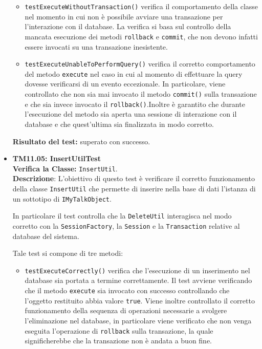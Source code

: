 \begin{itemize}
\begin{itemize}
\item \texttt{testExecuteWithoutTransaction()}
verifica il comportamento della classe nel momento in cui non è possibile avviare una transazione per l'interazione con il database.
La verifica si basa sul controllo della mancata esecuzione dei metodi \texttt{rollback} e \texttt{commit}, che non devono infatti essere invocati su una transazione inesistente.

\item \texttt{testExecuteUnableToPerformQuery()} verifica il corretto comportamento del metodo \texttt{execute} nel caso in cui al momento di effettuare la query dovesse verificarsi di un evento eccezionale. In particolare, viene controllato che non sia mai invocato il metodo \texttt{commit()} sulla transazione e che sia invece invocato il \texttt{rollback()}.Inoltre è garantito che durante l'esecuzione del metodo sia aperta una sessione di interazione con il database e che quest'ultima sia finalizzata in modo corretto. 
\end{itemize}
\textbf{Risultato del test:} superato con successo.

\item[\passed] \textbf{TM11.05: InsertUtilTest}\\
\textbf{Verifica la Classe:} \texttt{InsertUtil}.\\
\textbf{Descrizione}: L'obiettivo di questo test è verificare il corretto funzionamento della classe \texttt{InsertUtil} che permette di inserire nella base di dati l'istanza di un sottotipo di \texttt{IMyTalkObject}.

In particolare il test controlla che la \texttt{DeleteUtil} interagisca nel modo corretto con la \texttt{SessionFactory}, la \texttt{Session} e la \texttt{Transaction} relative al database del sistema.

Tale test si compone di tre metodi:
\begin{itemize}
\item \texttt{testExecuteCorrectly()} 
verifica che l'esecuzione di un inserimento nel database sia portata a termine correttamente. Il test avviene verificando che il metodo \texttt{execute} sia invocato con successo controllando che l'oggetto restituito abbia valore \texttt{true}. Viene inoltre controllato il corretto funzionamento della sequenza di operazioni necessarie a svolgere l'eliminazione nel database, in particolare viene verificato che non venga eseguita l'operazione di \texttt{rollback} sulla transazione, la quale significherebbe che la transazione non è andata a buon fine.


\end{itemize}
\end{itemize}
